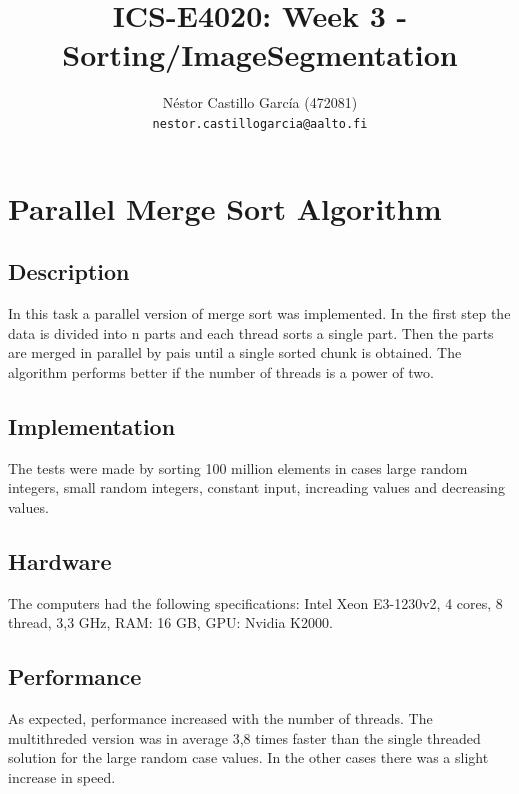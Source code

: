 \documentclass[a4paper,10pt]{article}
\title{ICS-E4020: Week 3 - Sorting/ImageSegmentation}
\author{Néstor Castillo García (472081)\\ 
       {\tt nestor.castillogarcia@aalto.fi}}
\begin{document}
\maketitle

\section{Parallel Merge Sort Algorithm}

\subsection{Description}

In this task a parallel version of merge sort was implemented. In the first step the data is divided into n parts and each thread sorts a single part. Then the parts are merged in parallel by pais until a single sorted chunk is obtained. The algorithm performs better if the number of threads is a power of two.


\subsection{Implementation}
The tests were made by sorting 100 million elements in cases large random integers, small random integers, constant input, increading values and decreasing values.


\subsection{Hardware}
The computers had the following specifications: Intel Xeon E3-1230v2, 4 cores, 8 thread, 3,3 GHz, RAM: 16 GB, GPU: Nvidia K2000.

\subsection{Performance}
As expected, performance increased with the number of threads. The multithreded version was in average 3,8 times faster than the single threaded solution for the large random case values. In the other cases there was a slight increase in speed.
\end{document}
